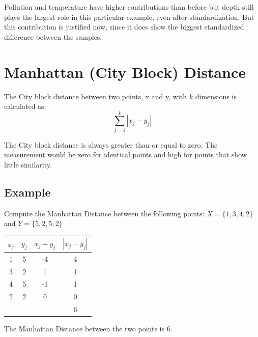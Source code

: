\documentclass[a4paper,12pt]{article}
\begin{document}
Pollution and temperature have higher contributions than before but depth still plays the
largest role in this particular example, even after standardization. But this contribution is
justified now, since it does show the biggest standardized difference between the samples. 
\newpage
\section*{Manhattan (City Block) Distance}
The City block distance between two points, x and y, with $k$ dimensions is calculated as:
\[ \sum^{k}_{j=1} | x_j - y_j |  \]

The City block distance is always greater than or equal to zero. The measurement would be zero for identical points and high for points that show little similarity.

\subsection*{Example}
Compute the Manhattan Distance between the following points: 
$X = \{1,3,4,2\}$ and $Y = \{5,2,5,2\}$


\begin{center}
\begin{tabular}{|c|c|c|c|}
  \hline
$x_j$	&	$y_j$	&   $x_j - y_j$	&	$| x_j - y_j |$	\\ \hline
1	&	5	&	-4	&	4	\\
3	&	2	&	1	&	1	\\
4	&	5	&	-1	&	1	\\
2	&	2	&	0	&	0	\\ \hline
& & & 6 \\
  \hline
\end{tabular}
\end{center}
The Manhattan Distance between the two points is 6.

\newpage
\end{document}
